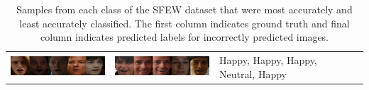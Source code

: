 \documentclass[10pt,twocolumn,letterpaper]{article}
\begin{document}
\begin{table}[!ht]
\begin{tabular}{m{2cm}m{5cm}m{5cm}m{4cm}}
\begin{minipage}{.3\textwidth}
		   \includegraphics[width=5cm]{res/6_best.pdf} 
		   \end{minipage}
		   & \begin{minipage}{.3\textwidth}
		   \includegraphics[width=5cm]{res/6_worst.pdf}
		    \end{minipage} & Happy, Happy, Happy, Neutral, Happy\\
		    \end{tabular}
		    \caption{Samples from each class of the SFEW dataset that were most accurately and least accurately classified. The first column indicates ground truth and final column indicates predicted labels for incorrectly predicted images.}
		    \label{tab:my_label}
		\end{table}
		
		
		
\end{document}
